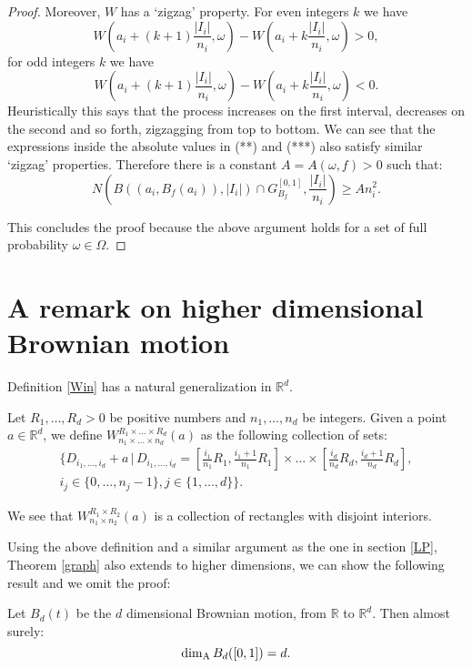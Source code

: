 \begin{proof}
	Moreover, $W$ has a `zigzag' property. For even integers $k$ we have
	\[
	W\left(a_i+(k+1)\frac{|I_i|}{n_i},\omega\right)-W\left(a_i+k\frac{|I_i|}{n_i},\omega\right)>0,
	\] 
	for odd integers $k$ we have
	\[
	W\left(a_i+(k+1)\frac{|I_i|}{n_i},\omega\right)-W\left(a_i+k\frac{|I_i|}{n_i},\omega\right)<0.
	\]  
	Heuristically this says that the process increases on the first interval, decreases on the second and so forth, zigzagging from top to bottom. We can see that the expressions inside the absolute values in (**) and (***) also satisfy similar `zigzag' properties. Therefore there is a constant $A=A(\omega,f)>0$ such that:
	\[
	N\left(B\left(\left(a_i,B_f(a_i)\right),|I_i|\right)\cap G_{B_f}^{[0,1]},\frac{|I_i|}{n_i}\right)\geq A n_i^2.
	\] 
	
	This concludes the proof because the above argument holds for a set of full probability $\omega\in\Omega$.
\end{proof}



\section{A remark on higher dimensional Brownian motion}

Definition \ref{Win} has a natural generalization in $\mathbb{R}^d$.
\begin{definition}\label{Win2}
	Let $R_1,\dots,R_d>0$ be positive numbers and $n_1,\dots, n_d$ be integers. Given a point $a\in\mathbb{R}^d$, we define $W_{n_1\times\dots\times n_d}^{R_1\times\dots\times R_d}(a)$ as the following collection of sets:
	\begin{eqnarray*}
		\Bigg\{D_{i_1,\dots,i_d}+a \, \vert \, D_{i_1,\dots,i_d}=\left[\frac{i_1}{n_1}R_1,\frac{i_1+1}{n_1}R_1\right]\times\dots\times \left[\frac{i_d}{n_d}R_d,\frac{i_d+1}{n_d}R_d\right],\\ i_j\in\{0,\dots,n_j-1\}, j\in\{1,\dots,d\}\Bigg\}.
	\end{eqnarray*}
	
	We see that $W_{n_1\times n_2}^{R_1\times R_2}(a)$ is a collection of rectangles with disjoint interiors.
\end{definition}

Using the above definition and a similar argument as the one in section \ref{LP},  Theorem \ref{graph} also extends to higher dimensions, we can show the following result and we omit the proof:

\begin{theorem}
	Let $B_d(t)$ be the $d$ dimensional Brownian motion, from $\mathbb{R}$ to $\mathbb{R}^d$. Then almost surely:
	\[
	\dim_{\textup{A}} B_d([0,1])=d.
	\]
\end{theorem}

